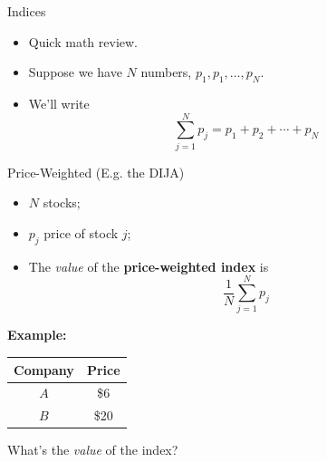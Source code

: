 \documentclass{beamer}
\begin{document}
\begin{frame}{Indices}
\begin{itemize}
\item Quick math review.
\item Suppose we have $N$ numbers, $p_{1},p_{1},\ldots,p_{N}$.
\item We'll write
\begin{equation}
\sum_{j=1}^{N}{p_{j}}=p_{1}+p_{2}+\cdots+p_{N}
\end{equation}
\end{itemize}
\end{frame}

\begin{frame}{Price-Weighted (E.g. the DIJA)}
\begin{itemize}
\item $N$ stocks; 
\item $p_{j}$ price of stock $j$;
\item The \textit{value} of the \textbf{price-weighted index} is
\begin{equation}
\frac{1}{N}\sum_{j=1}^{N}{p_{j}}
\end{equation}
\end{itemize}
\textbf{Example:}
\begin{center}
\begin{tabular}{cc}
\textbf{Company} & \textbf{Price} \\ \hline
$A$ & \$6 \\
$B$ & \$20
\end{tabular}
\end{center}
\begin{center}
What's the \textit{value} of the index?
\end{center}
\end{frame}
\end{document}
